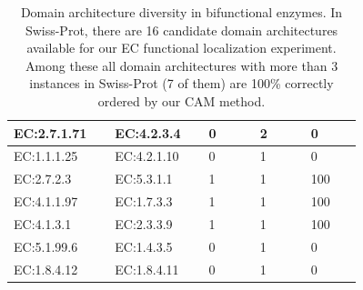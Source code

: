 \begin{table}[htbp]
\begin{tabular}{|p{0.2\linewidth}|p{0.2\linewidth}|p{0.12\linewidth}|p{0.12\linewidth}|p{0.12\linewidth}|}
  \hline
  EC:2.7.1.71  & EC:4.2.3.4    & 0                                            & 2                                        & 0                                   \\
  \hline
  EC:1.1.1.25  & EC:4.2.1.10   & 0                                            & 1                                        & 0                                   \\
  \hline
  EC:2.7.2.3   & EC:5.3.1.1    & 1                                            & 1                                        & 100                                 \\
  \hline
  EC:4.1.1.97  & EC:1.7.3.3    & 1                                            & 1                                        & 100                                 \\
  \hline
  EC:4.1.3.1   & EC:2.3.3.9    & 1                                            & 1                                        & 100                                 \\
  \hline
  EC:5.1.99.6  & EC:1.4.3.5    & 0                                            & 1                                        & 0                                  \\
  \hline
  EC:1.8.4.12  & EC:1.8.4.11   & 0                                            & 1                                        & 0                                   \\
  \hline
  \end{tabular}
  \caption{Domain architecture diversity in bifunctional enzymes. In Swiss-Prot, there are 16 candidate domain architectures available for our EC functional localization experiment. Among these all domain architectures with more than 3 instances in Swiss-Prot (7 of them) are 100\% correctly ordered by our CAM method.}
  \end{table}



